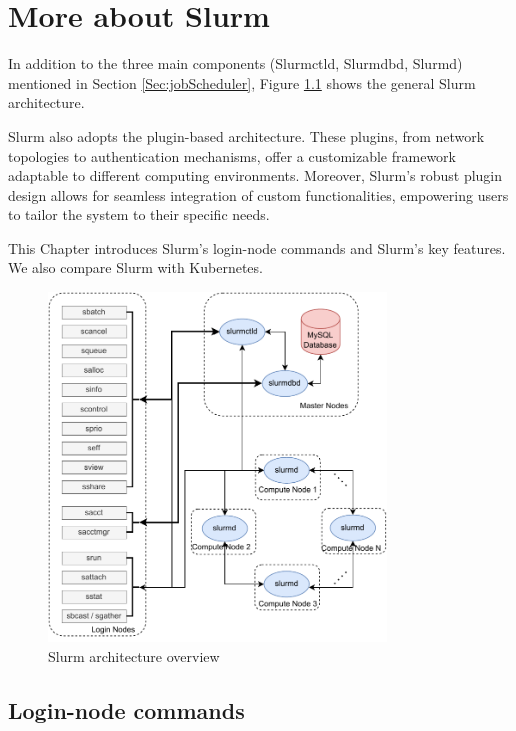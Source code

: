 \chapter{More about Slurm}

In addition to the three main components (Slurmctld, Slurmdbd, Slurmd) mentioned in Section \ref{Sec:jobScheduler}, Figure \ref{fig_slurm_overview} shows the general Slurm architecture.

Slurm also adopts the plugin-based architecture. These plugins, from network topologies to authentication mechanisms, offer a customizable framework adaptable to different computing environments. Moreover, Slurm's robust plugin design allows for seamless integration of custom functionalities, empowering users to tailor the system to their specific needs.

This Chapter introduces Slurm's login-node commands and Slurm's key features. We also compare Slurm with Kubernetes.

\begin{figure}[tb]
    \centering
    \includegraphics[width=0.8\textwidth]{figures/slurm-overview.pdf}
    \caption{Slurm architecture overview}
    \label{fig_slurm_overview}
\end{figure}



\section{Login-node commands}

